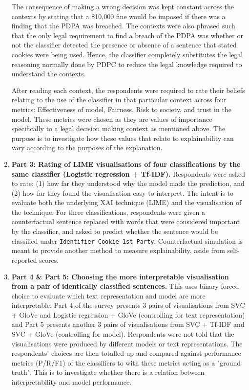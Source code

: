 \begin{enumerate}
	The consequence of making a wrong decision was kept constant across the contexts by stating that a \$10,000 fine would be imposed if there was a finding that the PDPA was breached. The contexts were also phrased such that the only legal requirement to find a breach of the PDPA was whether or not the classifier detected the presence or absence of a sentence that stated cookies were being used. Hence, the classifier completely substitutes the legal reasoning normally done by PDPC to reduce the legal knowledge required to understand the contexts.
	
	After reading each context, the respondents were required to rate their beliefs relating to the use of the classifier in that particular context across four metrics: Effectiveness of model, Fairness, Risk to society, and trust in the model. These metrics were chosen as they are values of importance specifically to a legal decision making context as mentioned above. The purpose is to investigate how these values that relate to explainability can vary according to the purposes of the explanation.

	\item \textbf{Part 3: Rating of LIME visualisations of four classifications by the same classifier (Logistic regression + Tf-IDF).} Respondents were asked to rate: (1) how far they understood why the model made the prediction, and (2) how far they found the visualisation easy to interpret. The intent is to evaluate both the underlying XAI technique (LIME) and the visualisation of the technique. For three classifications, respondents were given a counterfactual sentence replaced with words that were considered important by the classifier, and asked to predict whether the sentence would be classified under \texttt{Identifier Cookie 1st Party}. Counterfactual simulation is meant to provide another method to measure explainability, aside from self-reported scores.
	
	\item \textbf{Part 4 \& Part 5: Choosing the more interpretable visualisation from a pair of identically classified sentences.} This uses binary forced choice to evaluate which text representation and model are more interpretable. Part 4 of the survey presents 3 pairs of visualisations from SVC + GloVe and Logistic regression + GloVe (controlling for text representation) and Part 5 presents another 3 pairs of visualisations from SVC + Tf-IDF and SVC + GloVe (controlling for model). Respondents were not told that the visualisations were produced by different models or text representations. The respondents' choices are then totalled up and compared against performance metrics (P/R/F1) of the classifiers to with these metrics acting as a "ground truth". This is to investigate whether there is a relation between interpretability and model performance.
	

\end{enumerate}
